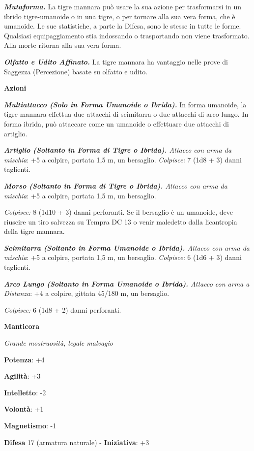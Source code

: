 \begin{multicols}{2}
\emph{\textbf{Mutaforma.}} La tigre mannara può usare la sua azione per
trasformarsi in un ibrido tigre-umanoide o in una tigre, o per tornare
alla sua vera forma, che è umanoide. Le sue statistiche, a parte la Difesa,
sono le stesse in tutte le forme. Qualsiasi equipaggiamento stia
indossando o trasportando non viene trasformato. Alla morte ritorna alla
sua vera forma.

\emph{\textbf{Olfatto e Udito Affinato.}} La tigre mannara ha vantaggio
nelle prove di Saggezza (Percezione) basate su olfatto e udito.

\textbf{Azioni}

\emph{\textbf{Multiattacco (Solo in Forma Umanoide o Ibrida).}} In forma
umanoide, la tigre mannara effettua due attacchi di scimitarra o due
attacchi di arco lungo. In forma ibrida, può attaccare come un umanoide
o effettuare due attacchi di artiglio.

\emph{\textbf{Artiglio (Soltanto in Forma di Tigre o Ibrida).} Attacco
con arma da mischia}: +5 a colpire, portata 1,5 m, un bersaglio.
\emph{Colpisce:} 7 (1d8 + 3) danni taglienti.

\emph{\textbf{Morso (Soltanto in Forma di Tigre o Ibrida).} Attacco con
arma da mischia}: +5 a colpire, portata 1,5 m, un bersaglio.

\emph{Colpisce:} 8 (1d10 + 3) danni perforanti. Se il bersaglio è un
umanoide, deve riuscire un tiro salvezza su Tempra DC 13 o venir
maledetto dalla licantropia della tigre mannara.

\emph{\textbf{Scimitarra (Soltanto in Forma Umanoide o Ibrida).} Attacco
con arma da mischia}: +5 a colpire, portata 1,5 m, un bersaglio.
\emph{Colpisce:} 6 (1d6 + 3) danni taglienti.

\emph{\textbf{Arco Lungo (Soltanto in Forma Umanoide o Ibrida).} Attacco
con arma a Distanza}: +4 a colpire, gittata 45/180 m, un bersaglio.

\emph{Colpisce:} 6 (1d8 + 2) danni perforanti.

\textbf{Manticora}

\emph{Grande mostruosità, legale malvagio}

\textbf{Potenza}: +4

\textbf{Agilità}: +3

\textbf{Intelletto}: -2

\textbf{Volontà}: +1

\textbf{Magnetismo}: -1

\textbf{Difesa} 17 (armatura naturale) - \textbf{Iniziativa}: +3


\end{multicols}
